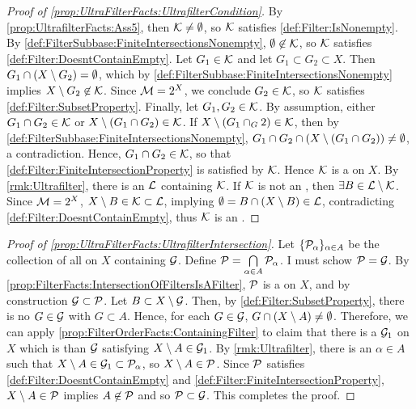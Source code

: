 \begin{prop}
\begin{proof}[Proof of \ref{prop:UltraFilterFacts:UltrafilterCondition}]
        By \ref{prop:UltrafilterFacts:Ass5}, then $\mathcal{K} \neq \emptyset$, so 
        $\mathcal{K}$ satisfies \ref{def:Filter:IsNonempty}.
        By \ref{def:FilterSubbase:FiniteIntersectionsNonempty}, 
        $\emptyset \not \in \mathcal{K}$, so 
        $\mathcal{K}$ satisfies \ref{def:Filter:DoesntContainEmpty}.
        Let $G_1 \in \mathcal{K}$ and let $G_1 \subset G_2 \subset X$. 
        Then $G_1 \cap \left( X \setminus G_2\right) = \emptyset$, 
        which by 
        \ref{def:FilterSubbase:FiniteIntersectionsNonempty}
        implies $X \setminus G_2 \not \in \mathcal{K}$. 
        Since $\mathcal{M} = 2^{X}$, we conclude $G_2 \in \mathcal{K}$, so
        $\mathcal{K}$ satisfies \ref{def:Filter:SubsetProperty}. 
        Finally, let 
        $G_1,G_2 \in \mathcal{K}$. 
        By assumption, either $G_1 \cap G_2 \in \mathcal{K}$  or $X \setminus \left( G_1 \cap G_2 \right) \in \mathcal{K}$. 
        If $X \setminus \left( G_1 \cap _G2\right) \in \mathcal{K}$, then by 
        \ref{def:FilterSubbase:FiniteIntersectionsNonempty}, 
        $G_1 \cap G_2 \cap \left( X \setminus \left( G_1 \cap G_2\right)\right) \neq \emptyset$, a contradiction.
        Hence, $G_1 \cap G_2 \in \mathcal{K}$, so that \ref{def:Filter:FiniteIntersectionProperty}
        is satisfied by $\mathcal{K}$. 
        Hence $\mathcal{K}$ is a \Filter on $X$. 
        By \ref{rmk:Ultrafilter}, there is an \Ultrafilter $\mathcal{L}$ containing $\mathcal{K}$. 
        If $\mathcal{K}$ is not an \Ultrafilter, then $\exists B \in \mathcal{L} \setminus \mathcal{K}$. 
        Since $\mathcal{M} = 2^{X}$, $X \setminus B \in \mathcal{K} \subset \mathcal{L}$, 
        implying $\emptyset =B \cap \left( X \setminus B\right)  \in \mathcal{L}$, contradicting 
        \ref{def:Filter:DoesntContainEmpty}, thus
        $\mathcal{K}$ is an \Ultrafilter. 
    \end{proof}
    \begin{proof}[Proof of \ref{prop:UltraFilterFacts:UltrafilterIntersection}]
    Let $\{\mathcal{P}_\alpha\}_{\alpha \in A}$ be the collection of all 
    \Ultrafilters on $X$ containing $\mathcal{G}$. 
    Define $\mathcal{P}=\bigcap\limits_{\alpha \in A} \mathcal{P}_\alpha$. 
    I must schow $\mathcal{P}=\mathcal{G}$. 
    By \ref{prop:FilterFacts:IntersectionOfFiltersIsAFilter}, 
    $\mathcal{P}$ is a \Filter on $X$, and by construction
    $\mathcal{G} \subset \mathcal{P}$.
    Let $B \subset X \setminus \mathcal{G}$. 
    Then, by 
    \ref{def:Filter:SubsetProperty}, 
    there is no $G \in \mathcal{G}$ with $G \subset A$. 
    Hence, for each $G \in \mathcal{G}$, $G \cap \left( X \setminus A\right) \neq \emptyset$. 
    Therefore, we can apply \ref{prop:FilterOrderFacts:ContainingFilter}
    to claim that there is a \Filter $\mathcal{G}_1$ on $X$ which is \FinerFilter
    than $\mathcal{G}$ satisfying $X \setminus A \in \mathcal{G}_1$. 
    By \ref{rmk:Ultrafilter}, there is an $\alpha \in A$ such that 
    $X \setminus A \in \mathcal{G}_1 \subset \mathcal{P}_\alpha$, so 
    $X \setminus A \in \mathcal{P}$. 
    Since 
    $\mathcal{P}$ satisfies \ref{def:Filter:DoesntContainEmpty}
    and \ref{def:Filter:FiniteIntersectionProperty}, 
    $X \setminus A \in \mathcal{P} $
    implies $A \not \in \mathcal{P}$
    and so $\mathcal{P} \subset \mathcal{G}$. 
    This completes the proof. 
    \end{proof}
\end{prop}
